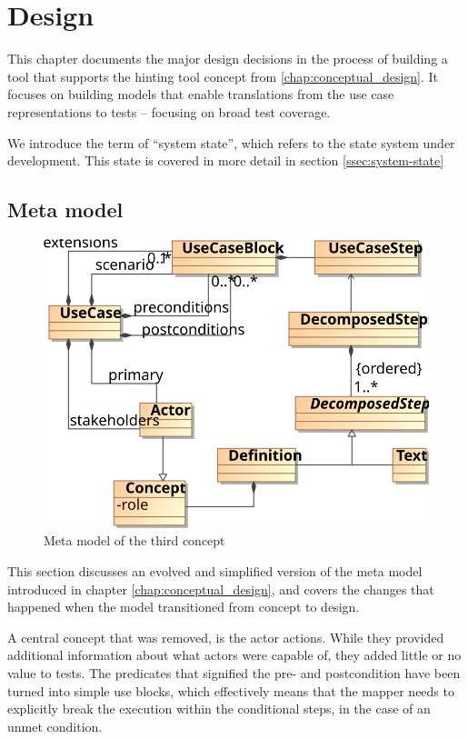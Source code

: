 \chapter{Design}
This chapter documents the major design decisions in the process of building a tool that supports the hinting tool concept from \ref{chap:conceptual_design}. It focuses on building models that enable translations from the use case representations to tests -- focusing on broad test coverage.\bigskip

\noindent We introduce the term of ``system state'', which refers to the state system under development. This state is covered in more detail in section \ref{ssec:system-state}

\section{Meta model}
\begin{figure}[!htbp]
  \centering
  \includegraphics[scale=0.9]{img/3rd_iteration_meta_model}
  \caption{Meta model of the third concept}
  \label{fig:3rd_iteration_meta_model}
\end{figure}
\noindent This section discusses an evolved and simplified version of the meta model introduced in chapter \ref{chap:conceptual_design}, and covers the changes that happened when the model transitioned from concept to design.\bigskip

\noindent A central concept that was removed, is the actor actions. While they provided additional information about what actors were capable of, they added little or no value to tests. The predicates that signified the pre- and postcondition have been turned into simple use blocks, which effectively means that the mapper needs to explicitly break the execution within the conditional steps, in the case of an unmet condition.\bigskip

